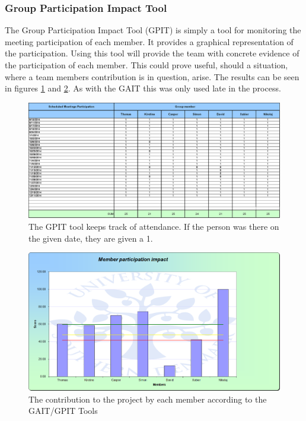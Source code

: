 \subsubsection{Group Participation Impact Tool}
The Group Participation Impact Tool (GPIT) is simply a tool for monitoring the meeting participation of each member. It provides a graphical representation of the participation. Using this tool will provide the team with concrete evidence of the participation of each member. This could prove useful, should a situation, where a team members contribution is in question, arise.  The results can be seen in figures \ref{fig:GPIT} and \ref{fig:GPITGraph}. As with the GAIT this was only used late in the process.  


\begin{figure}[ht]
	\includegraphics[width=\textwidth]{./graphics/gpit_attendance}
	\caption[The GPIT tool]{The GPIT tool keeps track of attendance. If the person was there on the given date, they are given a 1.}
	\label{fig:GPIT}
\end{figure}

\begin{figure}[ht]
	\includegraphics[width=\textwidth]{./graphics/GPIT_impact}
	\caption[The contribution by each member]{The contribution to the project by each member according to the GAIT/GPIT Tools}
	\label{fig:GPITGraph}
\end{figure}
